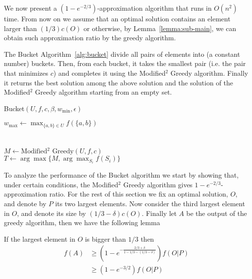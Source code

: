 We now present a $(1-e^{-2/3})$-approximation algorithm that runs in $O(n^2)$ time.
From now on we assume that an optimal solution contains an element larger than $(1/3)c(O)$ or otherwise, by Lemma~\ref{lemma:sub-main}, we can obtain such approximation ratio by the greedy algorithm.

The Bucket Algorithm~\ref{alg:bucket} divide all pairs of elements into (a constant number) buckets.
Then, from each bucket, it takes the smallest pair (i.e. the pair that minimizes $c$) and completes it using the Modified$^2$ Greedy algorithm.
Finally it returns the best solution among the above solution and the solution of the Modified$^2$ Greedy algorithm starting from an empty set.

\begin{algorithm}
	\label{alg:bucket}
	\caption{Bucket$(U, f, c, \beta, w_{\min}, \epsilon)$}
	$w_{\max} \leftarrow \max_{\{a, b\} \in U}f(\{a, b\})$
	\\
	\\
	\\
	$M \leftarrow \text{Modified$^2$ Greedy}(U, f, c)$
	\\
	$T \leftarrow \arg\max\{M, \arg\max_{S_i}f(S_i)\}$
	\\
\end{algorithm}

To analyze the performance of the Bucket algorithm we start by showing that,  under certain conditions, the Modified$^2$ Greedy algorithm gives $1 - e^{-2/3}$-approximation ratio.
For the rest of this section we fix an optimal solution, $O$, and denote by $P$ its two largest elements.
Now consider the third largest element in $O$, and denote its size by $(1/3 - \delta)c(O)$.
Finally let $A$ be the output of the greedy algorithm, then we have the following lemma

\begin{lemma}
	\label{eq:sub:greedy}
	If the largest element in $O$ is bigger than $1/3$ then
	\begin{align*}
		f(A) & \geq (1-e^{-\frac{2/3 + \delta}{1 - 1/3 - (1/3 - \delta)}})f(O|P)
		\\		& \geq (1 - e^{-3/2})f(O|P)
	\end{align*}
\end{lemma}

